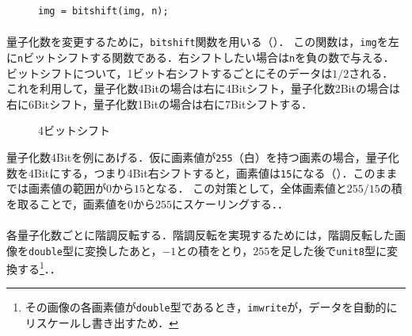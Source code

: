 \begin{figure}
    \centering
    \vspace{-.7cm}
    \begin{lstlisting}[caption={\texttt{bitshift}関数},label={src:bitshift}]
img = bitshift(img, n);
    \end{lstlisting}
    \vspace{-.5cm}
\end{figure}
\paragraph{\kadaiab}
量子化数を変更するために，\texttt{bitshift}関数を用いる（）．
この関数は，\texttt{img}を左に\texttt{n}ビットシフトする関数である．右シフトしたい場合は\texttt{n}を負の数で与える．
ビットシフトについて，1ビット右シフトするごとにそのデータは\(1/2\)される．
これを利用して，量子化数4Bitの場合は右に4Bitシフト，量子化数2Bitの場合は右に6Bitシフト，量子化数1Bitの場合は右に7Bitシフトする．

\begin{figure}
    \centering
    \vspace{-.5cm}
    \caption{4ビットシフト}
    \label{fig:4ビットシフト}
    \vspace{-.5cm}
\end{figure}
量子化数4Bitを例にあげる．仮に画素値が\texttt{255}（白）を持つ画素の場合，量子化数を4Bitにする，つまり4Bit右シフトすると，画素値は\texttt{15}になる（）．このままでは画素値の範囲が\(0\)から\(15\)となる．
この対策として，全体画素値と\(255/15\)の積を取ることで，画素値を\(0\)から\(255\)にスケーリングする．\scall{\kadaiab}．
\paragraph{\kadaiac}
各量子化数ごとに階調反転する．階調反転を実現するためには，階調反転した画像を\texttt{double}型に変換したあと，\(-1\)との積をとり，\(255\)を足した後で\texttt{unit8}型に変換する\footnote{その画像の各画素値が\texttt{double}型であるとき，\texttt{imwrite}が，データを自動的にリスケールし書き出すため．}．\scall{\kadaiac}．

